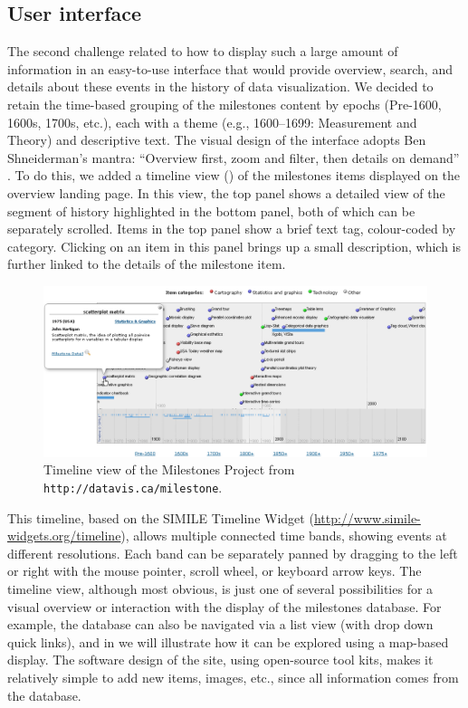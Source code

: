 \subsection{User interface}
The second challenge related to how to display such a large amount of 
information in an easy-to-use interface that would provide overview, search, 
and details about these events in the history of data visualization. 
We decided 
to retain the time-based grouping of the milestones content by epochs 
(Pre-1600, 1600s, 1700s, etc.), each with a theme (e.g., 1600--1699: 
Measurement and Theory) and descriptive text. 
The visual design of the 
interface adopts Ben Shneiderman's mantra: ``Overview first, zoom and filter, 
then details on demand'' \citep{Shneiderman:1996:IEEE}. 
To do this, we added a 
timeline view () of the milestones items 
displayed on the overview landing page.  
In this view, the top panel shows a detailed view of the segment of history highlighted in the bottom panel, 
both of which can be separately scrolled. 
Items in the top panel show a brief text tag, colour-coded by category. 
Clicking on an item in this panel brings up a small description, which is further linked to the details of the milestone item.

\begin{figure}[!htb]
  \centering
  \includegraphics[width=\textwidth,clip]{fig/datavis-timeline2}
  \caption{Timeline view of the Milestones Project from 
  \texttt{http://datavis.ca/milestone}. }  
  \label{fig:datavis-timeline2}
\end{figure}

This timeline, based on the SIMILE Timeline Widget 
(\url{http://www.simile-widgets.org/timeline}), allows multiple connected time 
bands, showing events at different resolutions.  
Each band can be separately 
panned by dragging to the left or right with the mouse pointer, scroll wheel, or 
keyboard arrow keys. 
The timeline view, although most obvious, is just one of 
several possibilities for a visual overview or interaction with the display of 
the milestones database. 
For example, the 
database can also be navigated via a list view (with drop down quick links), 
and in  we will illustrate how it can be explored using a 
map-based display.
The software design of the site, using open-source 
tool kits, makes it relatively simple to add new items, images, etc., since all information
comes from the database.
